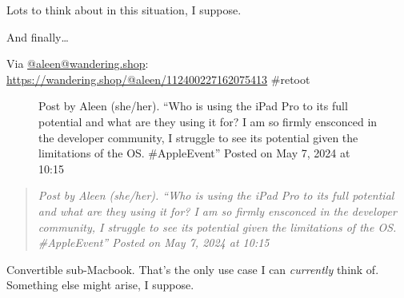 Lots to think about in this situation, I suppose.

And finally\ldots{}

Via \href{https://wandering.shop/@aleen/}{@aleen@wandering.shop}:
\url{https://wandering.shop/@aleen/112400227162075413} \#retoot

\begin{figure}
\centering
{}
\caption{Post by Aleen (she/her). ``Who is using the iPad Pro to its
full potential and what are they using it for? I am so firmly ensconced
in the developer community, I struggle to see its potential given the
limitations of the OS. \#AppleEvent'' Posted on May 7, 2024 at 10:15}
\end{figure}

\begin{quote}
\emph{Post by Aleen (she/her). ``Who is using the iPad Pro to its full
potential and what are they using it for? I am so firmly ensconced in
the developer community, I struggle to see its potential given the
limitations of the OS. \#AppleEvent'' Posted on May 7, 2024 at 10:15}
\end{quote}

Convertible sub-Macbook. That's the only use case I can \emph{currently}
think of. Something else might arise, I suppose.
